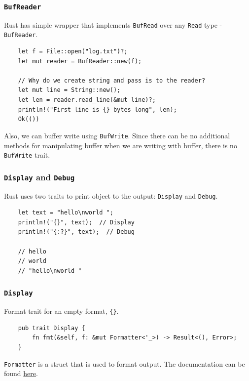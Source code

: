 \documentclass[aspectratio=1610,t]{beamer}
\begin{document}

\begin{frame}[fragile]
\frametitle{\texttt{BufReader}}
Rust has simple wrapper that implements \texttt{BufRead} over any \texttt{Read} type - \texttt{BufReader}.

\begin{verbatim}
    let f = File::open("log.txt")?;
    let mut reader = BufReader::new(f);

    // Why do we create string and pass is to the reader?
    let mut line = String::new();
    let len = reader.read_line(&mut line)?;
    println!("First line is {} bytes long", len);
    Ok(())
\end{verbatim}

Also, we can buffer write using \texttt{BufWrite}. Since there can be no additional methods for manipulating buffer when we are writing with buffer, there is no \texttt{BufWrite} trait.
\end{frame}


\begin{frame}[fragile]
\frametitle{\texttt{Display} and \texttt{Debug}}
Rust uses two traits to print object to the output: \texttt{Display} and \texttt{Debug}.

\begin{verbatim}
    let text = "hello\nworld ";
    println!("{}", text);  // Display
    println!("{:?}", text);  // Debug

    // hello
    // world
    // "hello\nworld "
\end{verbatim}
\end{frame}


\begin{frame}[fragile]
\frametitle{\texttt{Display}}
Format trait for an empty format, \texttt{\{\}}.

\begin{verbatim}
    pub trait Display {
        fn fmt(&self, f: &mut Formatter<'_>) -> Result<(), Error>;
    }
\end{verbatim}

\texttt{Formatter} is a struct that is used to format output. The documentation can be found \href{https://doc.rust-lang.org/std/fmt/struct.Formatter.html}{here}.
\end{frame}
\end{document}
